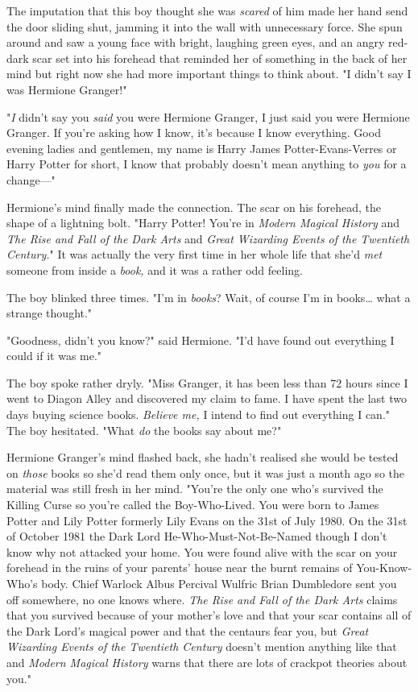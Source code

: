 The imputation that this boy thought she was \emph{scared} of him made her hand 
send the door sliding shut, jamming it into the wall with unnecessary force. 
She spun around and saw a young face with bright, laughing green eyes, and an 
angry red-dark scar set into his forehead that reminded her of something in the 
back of her mind but right now she had more important things to think about. "I 
didn't say I was Hermione Granger!"

"\emph{I} didn't say you \emph{said} you were Hermione Granger, I just said you 
were Hermione Granger. If you're asking how I know, it's because I know 
everything. Good evening ladies and gentlemen, my name is Harry James 
Potter-Evans-Verres or Harry Potter for short, I know that probably doesn't 
mean anything to \emph{you} for a change---"

Hermione's mind finally made the connection. The scar on his forehead, the 
shape of a lightning bolt. "Harry Potter! You're in \emph{Modern Magical 
History} and \emph{The Rise and Fall of the Dark Arts} and \emph{Great 
Wizarding Events of the Twentieth Century.}" It was actually the very first 
time in her whole life that she'd \emph{met} someone from inside a \emph{book,} 
and it was a rather odd feeling.

The boy blinked three times. "I'm in \emph{books}? Wait, of course I'm in 
books{\ldots} what a strange thought."

"Goodness, didn't you know?" said Hermione. "I'd have found out everything I 
could if it was me."

The boy spoke rather dryly. "Miss Granger, it has been less than 72 hours since 
I went to Diagon Alley and discovered my claim to fame. I have spent the last 
two days buying science books. \emph{Believe me,} I intend to find out 
everything I can." The boy hesitated. "What \emph{do} the books say about me?"

Hermione Granger's mind flashed back, she hadn't realised she would be tested 
on \emph{those} books so she'd read them only once, but it was just a month ago 
so the material was still fresh in her mind. "You're the only one who's 
survived the Killing Curse so you're called the Boy-Who-Lived. You were born to 
James Potter and Lily Potter formerly Lily Evans on the 31st of July 1980. On 
the 31st of October 1981 the Dark Lord He-Who-Must-Not-Be-Named though I don't 
know why not attacked your home. You were found alive with the scar on your 
forehead in the ruins of your parents' house near the burnt remains of 
You-Know-Who's body. Chief Warlock Albus Percival Wulfric Brian Dumbledore sent 
you off somewhere, no one knows where. \emph{The Rise and Fall of the Dark 
Arts} claims that you survived because of your mother's love and that your scar 
contains all of the Dark Lord's magical power and that the centaurs fear you, 
but \emph{Great Wizarding Events of the Twentieth Century} doesn't mention 
anything like that and \emph{Modern Magical History} warns that there are lots 
of crackpot theories about you."

